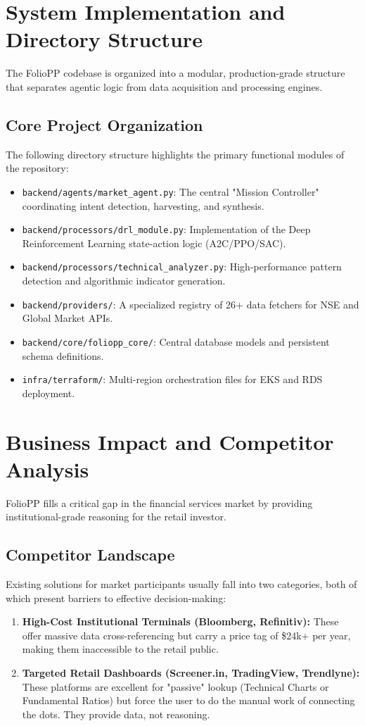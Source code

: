 \documentclass[13pt,a4paper]{article}
\begin{document}
\section{System Implementation and Directory Structure}
The FolioPP codebase is organized into a modular, production-grade structure that separates agentic logic from data acquisition and processing engines.

\subsection{Core Project Organization}
The following directory structure highlights the primary functional modules of the repository:
\begin{itemize}
    \item \texttt{backend/agents/market\_agent.py}: The central "Mission Controller" coordinating intent detection, harvesting, and synthesis.
    \item \texttt{backend/processors/drl\_module.py}: Implementation of the Deep Reinforcement Learning state-action logic (A2C/PPO/SAC).
    \item \texttt{backend/processors/technical\_analyzer.py}: High-performance pattern detection and algorithmic indicator generation.
    \item \texttt{backend/providers/}: A specialized registry of 26+ data fetchers for NSE and Global Market APIs.
    \item \texttt{backend/core/foliopp\_core/}: Central database models and persistent schema definitions.
    \item \texttt{infra/terraform/}: Multi-region orchestration files for EKS and RDS deployment.
\end{itemize}

\section{Business Impact and Competitor Analysis}
FolioPP fills a critical gap in the financial services market by providing institutional-grade reasoning for the retail investor.

\subsection{Competitor Landscape}
Existing solutions for market participants usually fall into two categories, both of which present barriers to effective decision-making:
\begin{enumerate}
    \item \textbf{High-Cost Institutional Terminals (Bloomberg, Refinitiv):} These offer massive data cross-referencing but carry a price tag of \$24k+ per year, making them inaccessible to the retail public.
    \item \textbf{Targeted Retail Dashboards (Screener.in, TradingView, Trendlyne):} These platforms are excellent for "passive" lookup (Technical Charts or Fundamental Ratios) but force the user to do the manual work of connecting the dots. They provide data, not reasoning.
\end{enumerate}
\end{document}
